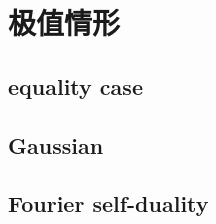 \section{极值情形}
\label{b2:sec:2002}


\subsection{equality case}
\label{b2:subsec:200201}

\subsection{Gaussian}
\label{b2:subsec:200202}

\subsection{Fourier self-duality}
\label{b2:subsec:200203}


